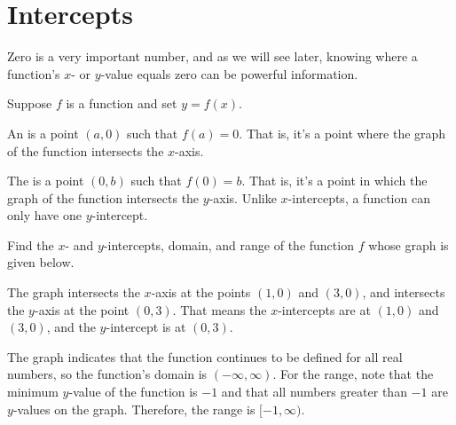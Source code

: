 \documentclass[noauthor, nooutcomes]{ximera}
\begin{document}
\section{Intercepts}
Zero is a very important number, and as we will see later, knowing where a function's $x$- or $y$-value equals zero can be powerful information. 

\begin{definition}[Intercepts]
	Suppose $f$ is a function and set $y=f(x)$.

	An  is a point $(a,0)$ such that $f(a) = 0$. That is, it's a 
	point where the graph of the function intersects the $x$-axis. 

	The  is a point $(0,b)$ such that $f(0) = b$. That is, it's a 
	point in which the graph of the function intersects the $y$-axis. Unlike 
	$x$-intercepts, a function can only have one $y$-intercept.
\end{definition}


\begin{example}
	Find the $x$- and $y$-intercepts, domain, and range of the function $f$ whose graph is given below.
	\begin{image}
	\end{image}
	\begin{explanation}
		The graph intersects the $x$-axis at the points $(1,0)$ and $(3,0)$, and intersects the $y$-axis at the point $(0,3)$.
		That means the $x$-intercepts are at $(1,0)$ and $(3, 0)$, and the $y$-intercept is at $(0, 3)$.
		
		The graph indicates that the function continues to be defined for all real numbers, so the function's domain is $(-\infty, \infty)$.
		For the range, note that the minimum $y$-value of the function is $-1$ and that all numbers greater than $-1$ are $y$-values on the graph. Therefore, the range is $[-1, \infty)$. 
	\end{explanation}
\end{example}
\end{document}
